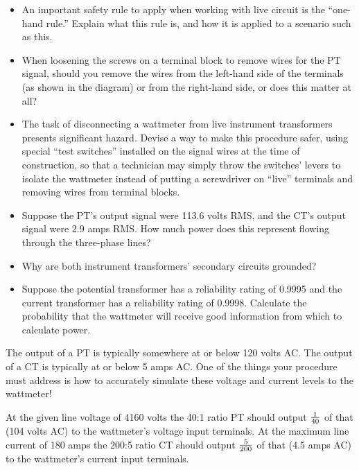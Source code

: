 \begin{itemize}
\item{} An important safety rule to apply when working with live circuit is the ``one-hand rule.''  Explain what this rule is, and how it is applied to a scenario such as this.
\item{} When loosening the screws on a terminal block to remove wires for the PT signal, should you remove the wires from the left-hand side of the terminals (as shown in the diagram) or from the right-hand side, or does this matter at all?  
\item{} The task of disconnecting a wattmeter from live instrument transformers presents significant hazard.  Devise a way to make this procedure safer, using special ``test switches'' installed on the signal wires at the time of construction, so that a technician may simply throw the switches' levers to isolate the wattmeter instead of putting a screwdriver on ``live'' terminals and removing wires from terminal blocks.
\item{} Suppose the PT's output signal were 113.6 volts RMS, and the CT's output signal were 2.9 amps RMS.  How much power does this represent flowing through the three-phase lines?
\item{} Why are both instrument transformers' secondary circuits grounded?
\item{} Suppose the potential transformer has a reliability rating of 0.9995 and the current transformer has a reliability rating of 0.9998.  Calculate the probability that the wattmeter will receive good information from which to calculate power.
\end{itemize}







The output of a PT is typically somewhere at or below 120 volts AC.  The output of a CT is typically at or below 5 amps AC.  One of the things your procedure must address is how to accurately simulate these voltage and current levels to the wattmeter!

\vskip 10pt

At the given line voltage of 4160 volts the 40:1 ratio PT should output $1 \over 40$ of that (104 volts AC) to the wattmeter's voltage input terminals.  At the maximum line current of 180 amps the 200:5 ratio CT should output $5 \over 200$ of that (4.5 amps AC) to the wattmeter's current input terminals.

